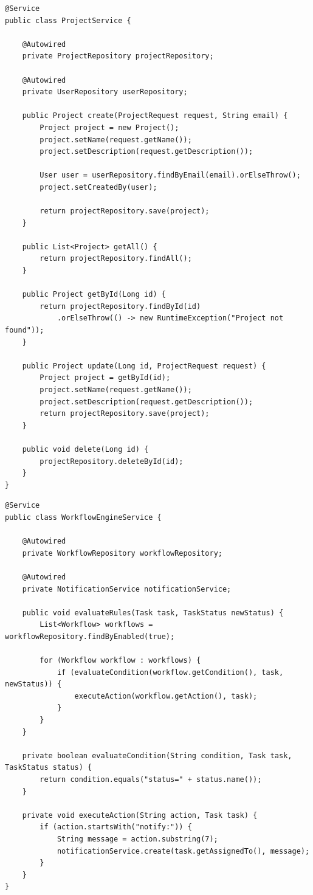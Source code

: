 \documentclass[12pt,a4paper,twoside]{book}
\begin{document}
\begin{lstlisting}[style=java]
@Service
public class ProjectService {
    
    @Autowired
    private ProjectRepository projectRepository;
    
    @Autowired
    private UserRepository userRepository;
    
    public Project create(ProjectRequest request, String email) {
        Project project = new Project();
        project.setName(request.getName());
        project.setDescription(request.getDescription());
        
        User user = userRepository.findByEmail(email).orElseThrow();
        project.setCreatedBy(user);
        
        return projectRepository.save(project);
    }
    
    public List<Project> getAll() {
        return projectRepository.findAll();
    }
    
    public Project getById(Long id) {
        return projectRepository.findById(id)
            .orElseThrow(() -> new RuntimeException("Project not found"));
    }
    
    public Project update(Long id, ProjectRequest request) {
        Project project = getById(id);
        project.setName(request.getName());
        project.setDescription(request.getDescription());
        return projectRepository.save(project);
    }
    
    public void delete(Long id) {
        projectRepository.deleteById(id);
    }
}
\end{lstlisting}

\begin{lstlisting}[style=java]
@Service
public class WorkflowEngineService {
    
    @Autowired
    private WorkflowRepository workflowRepository;
    
    @Autowired
    private NotificationService notificationService;
    
    public void evaluateRules(Task task, TaskStatus newStatus) {
        List<Workflow> workflows = workflowRepository.findByEnabled(true);
        
        for (Workflow workflow : workflows) {
            if (evaluateCondition(workflow.getCondition(), task, newStatus)) {
                executeAction(workflow.getAction(), task);
            }
        }
    }
    
    private boolean evaluateCondition(String condition, Task task, TaskStatus status) {
        return condition.equals("status=" + status.name());
    }
    
    private void executeAction(String action, Task task) {
        if (action.startsWith("notify:")) {
            String message = action.substring(7);
            notificationService.create(task.getAssignedTo(), message);
        }
    }
}
\end{lstlisting}
\end{document}
